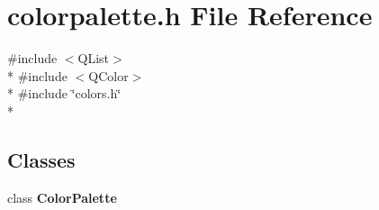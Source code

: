 \section{colorpalette.\+h File Reference}
\label{bk3_2colorpalette_8h}
{\ttfamily \#include $<$Q\+List$>$}\\*
{\ttfamily \#include $<$Q\+Color$>$}\\*
{\ttfamily \#include \char`\"{}colors.\+h\char`\"{}}\\*
\subsection*{Classes}
\begin{DoxyCompactItemize}
\item 
class {\bf Color\+Palette}
\end{DoxyCompactItemize}
